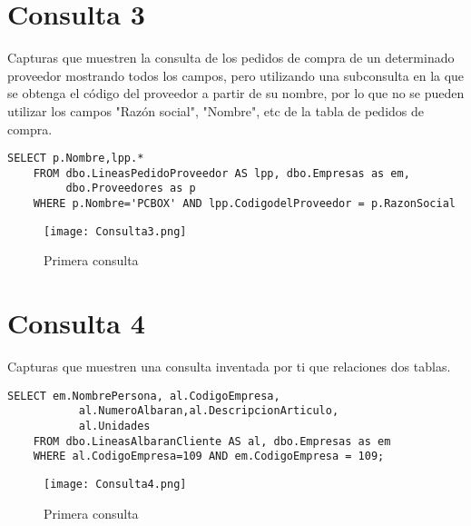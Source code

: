 \documentclass{article}
\begin{document}
\newpage
  \section{Consulta 3}
    Capturas que muestren la consulta de los pedidos de compra de un determinado proveedor mostrando todos los campos, pero utilizando una subconsulta en la que se obtenga el código del proveedor a partir de su nombre, por lo que no se pueden utilizar los campos "Razón social", "Nombre", etc de la tabla de pedidos de compra.

    \begin{lstlisting}[style=C]
    SELECT p.Nombre,lpp.*
    FROM dbo.LineasPedidoProveedor AS lpp, dbo.Empresas as em,
	     dbo.Proveedores as p
    WHERE p.Nombre='PCBOX' AND lpp.CodigodelProveedor = p.RazonSocial
    \end{lstlisting}
    
    \begin{figure}[h]
        \centering
        \texttt{[image: Consulta3.png]}
        \caption{Primera consulta}
        \label{fig:my_label}
    \end{figure}
    
\newpage
  \section{Consulta 4}
    Capturas que muestren una consulta inventada por ti que relaciones dos tablas.

    \begin{lstlisting}[style=C]
    SELECT em.NombrePersona, al.CodigoEmpresa,
           al.NumeroAlbaran,al.DescripcionArticulo,
           al.Unidades 
    FROM dbo.LineasAlbaranCliente AS al, dbo.Empresas as em
    WHERE al.CodigoEmpresa=109 AND em.CodigoEmpresa = 109;
    \end{lstlisting}
    
    \begin{figure}[h]
        \centering
        \texttt{[image: Consulta4.png]}
        \caption{Primera consulta}
        \label{fig:my_label}
    \end{figure}
\end{document}

